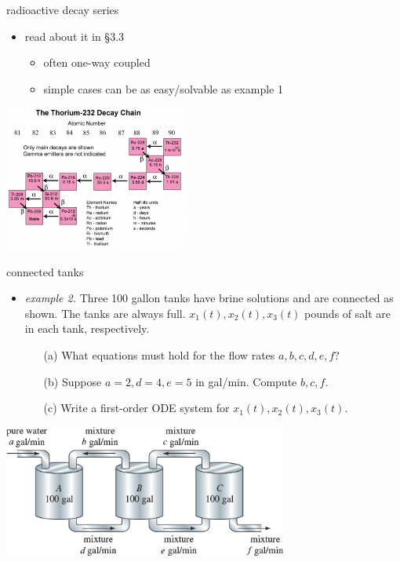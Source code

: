 \documentclass[urlcolor=blue,dvipsnames]{beamer}
\begin{document}
\begin{frame}{radioactive decay series}

\begin{itemize}
\item read about it in \S3.3

    \begin{itemize}
    \item often one-way coupled
    \item simple cases can be as easy/solvable as example 1
    \end{itemize}
\end{itemize}

\bigskip
\begin{center}
\includegraphics[width=0.45\textwidth]{figs/thorium232-decay}
\end{center}
\end{frame}


\begin{frame}{connected tanks}

\begin{itemize}
\item \emph{example 2.}  Three 100 gallon tanks have brine solutions and are connected as shown.  The tanks are always full.  $x_1(t),x_2(t),x_3(t)$ pounds of salt are in each tank, respectively.
    \begin{itemize}
    \item[(a)] What equations must hold for the flow rates $a,b,c,d,e,f$?
    \item[(b)] Suppose $a=2,d=4,e=5$ in gal/min.  Compute $b,c,f$.
    \item[(c)] Write a first-order ODE system for $x_1(t),x_2(t),x_3(t)$.
    \end{itemize}
\end{itemize}

\begin{center}
\includegraphics[width=0.7\textwidth]{figs/three-tanks}
\end{center}
\end{frame}
\end{document}

